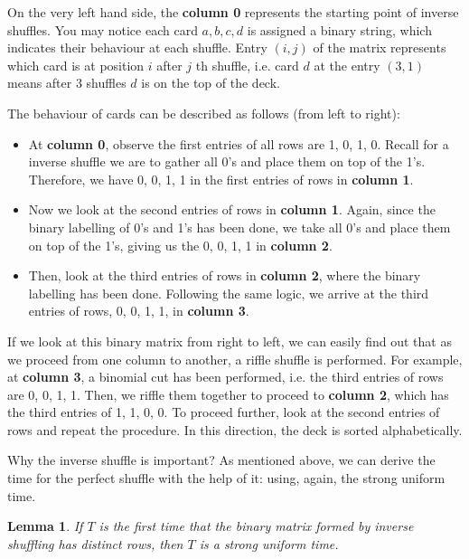 \documentclass[12pt]{article}
\theoremstyle{plain}
\newtheorem{lemma}{Lemma}
\theoremstyle{definition}
\theoremstyle{remark}
\begin{document}
On the very left hand side, the \textbf{column 0} represents the starting point of inverse shuffles. You may notice each card $a,b,c,d$ is assigned a binary string, which indicates their behaviour at each shuffle. Entry $(i,j)$ of the matrix represents which card is at position $i$ after $j$ th shuffle, i.e. card $d$ at the entry $(3,1)$ means after 3 shuffles $d$ is on the top of the deck.

The behaviour of cards can be described as follows (from left to right): 
\begin{itemize}
    \item At \textbf{column 0}, observe the first entries of all rows are 1, 0, 1, 0. Recall for a inverse shuffle we are to gather all 0's and place them on top of the 1's. Therefore, we have 0, 0, 1, 1 in the first entries of rows in \textbf{column 1}.
    
    \item Now we look at the second entries of rows in \textbf{column 1}. Again, since the binary labelling of 0's and 1's has been done, we take all 0's and place them on top of the 1's, giving us the 0, 0, 1, 1 in \textbf{column 2}. 
    
    \item Then, look at the third entries of rows in \textbf{column 2}, where the binary labelling has been done. Following the same logic, we arrive at the third entries of rows, 0, 0, 1, 1, in \textbf{column 3}.
\end{itemize}

If we look at this binary matrix from right to left, we can easily find out that as we proceed from one column to another, a riffle shuffle is performed. For example, at \textbf{column 3}, a binomial cut has been performed, i.e. the third entries of rows are 0, 0, 1, 1. Then, we riffle them together to proceed to \textbf{column 2}, which has the third entries of 1, 1, 0, 0. To proceed further, look at the second entries of rows and repeat the procedure. In this direction, the deck is sorted alphabetically.

Why the inverse shuffle is important? As mentioned above, we can derive the time for the perfect shuffle with the help of it: using, again, the strong uniform time.

\begin{lemma}\cite[Lemma~9 on \pno~344]{1.1}
If $T$ is the first time that the binary matrix formed by inverse shuffling has distinct rows, then $T$ is a strong uniform time.
\end{lemma} 
\end{document}
